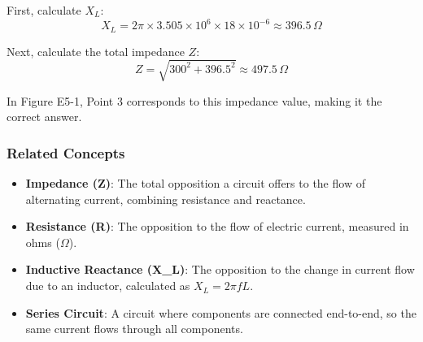 First, calculate \( X_L \):
\[
X_L = 2\pi \times 3.505 \times 10^6 \times 18 \times 10^{-6} \approx 396.5 \, \Omega
\]

Next, calculate the total impedance \( Z \):
\[
Z = \sqrt{300^2 + 396.5^2} \approx 497.5 \, \Omega
\]

In Figure E5-1, Point 3 corresponds to this impedance value, making it the correct answer.

\subsubsection{Related Concepts}
\begin{itemize}
    \item \textbf{Impedance (Z)}: The total opposition a circuit offers to the flow of alternating current, combining resistance and reactance.
    \item \textbf{Resistance (R)}: The opposition to the flow of electric current, measured in ohms (\(\Omega\)).
    \item \textbf{Inductive Reactance (X\_L)}: The opposition to the change in current flow due to an inductor, calculated as \( X_L = 2\pi f L \).
    \item \textbf{Series Circuit}: A circuit where components are connected end-to-end, so the same current flows through all components.
\end{itemize}

